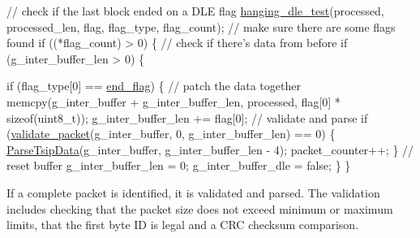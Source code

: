 \begin{DoxyCodeInclude}
      \textcolor{comment}{// check if the last block ended on a DLE flag}
      \hyperlink{tsip__decode_8h_a812dd629379f16c30e1dba03db6745fc}{hanging\_dle\_test}(processed, processed\_len, flag, flag\_type, flag\_count);
      \textcolor{comment}{// make sure there are some flags found}
      \textcolor{keywordflow}{if} ((*flag\_count) > 0) \{
        \textcolor{comment}{// check if there's data from before}
        \textcolor{keywordflow}{if} (g\_inter\_buffer\_len > 0) \{

          \textcolor{keywordflow}{if} (flag\_type[0] == \hyperlink{tsip__decode_8h_aaadb960acba914ffc497ac7b256cdd55a5ed0c9e4189b86c84f9ded0501e9dd18}{end\_flag}) \{
            \textcolor{comment}{// patch the data together}
            memcpy(g\_inter\_buffer + g\_inter\_buffer\_len, processed,
                   flag[0] * \textcolor{keyword}{sizeof}(uint8\_t));
            g\_inter\_buffer\_len += flag[0];
            \textcolor{comment}{// validate and parse}
            \textcolor{keywordflow}{if} (\hyperlink{tsip__decode_8h_a41c4ae0abb32c8c722925578007e711b}{validate\_packet}(g\_inter\_buffer, 0, g\_inter\_buffer\_len) == 0) \{
              \hyperlink{tsip__read_8h_aaf187111fc27885f025120a9bf69de0d}{ParseTsipData}(g\_inter\_buffer, g\_inter\_buffer\_len - 4);
              packet\_counter++;
            \}
            \textcolor{comment}{// reset buffer}
            g\_inter\_buffer\_len = 0;
            g\_inter\_buffer\_dle = \textcolor{keyword}{false};
          \}
        \}
\end{DoxyCodeInclude}
 If a complete packet is identified, it is validated and parsed. The validation includes checking that the packet size does not exceed minimum or maximum limits, that the first byte ID is legal and a C\+RC checksum comparison.


